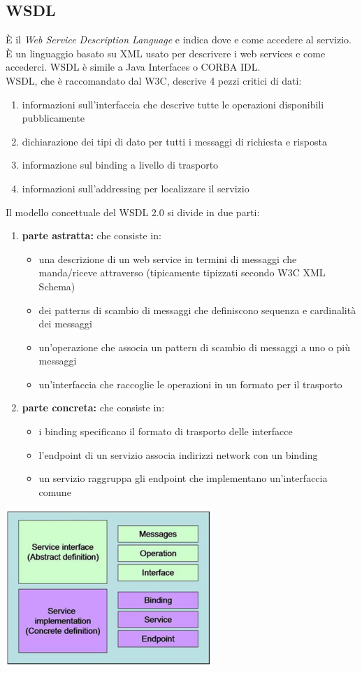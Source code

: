 \documentclass[a4paper,12pt, oneside]{book}
\begin{document}
\subsection{WSDL}
È il \textit{Web Service Description Language} e indica dove e come accedere al servizio.
È un linguaggio basato su XML usato per descrivere i web services e come accederci.
WSDL è simile a Java Interfaces o CORBA IDL.\\
WSDL, che è raccomandato dal W3C, descrive 4 pezzi critici di dati:
\begin{enumerate}
\item informazioni sull'interfaccia che descrive tutte le operazioni disponibili pubblicamente
\item dichiarazione dei tipi di dato per tutti i messaggi di richiesta e risposta
\item informazione sul binding a livello di trasporto
\item informazioni sull'addressing per localizzare il servizio
\end{enumerate}
Il modello concettuale del WSDL 2.0 si divide in due parti:
\begin{enumerate}
\item \textbf{parte astratta:} che consiste in:
 \begin{itemize}
 \item una descrizione di un web service in termini di messaggi che manda/riceve attraverso (tipicamente tipizzati secondo W3C XML Schema)
 \item dei patterns di scambio di messaggi che definiscono sequenza e cardinalità dei messaggi
 \item un'operazione che associa un pattern di scambio di messaggi a uno o più messaggi
 \item un'interfaccia che raccoglie le operazioni in un formato per il trasporto
 \end{itemize}
\item \textbf{parte concreta:} che consiste in:
  \begin{itemize}
    \item i binding specificano il formato di trasporto delle interfacce
    \item l'endpoint di un servizio associa indirizzi network con un binding   
   \item un servizio raggruppa gli endpoint che implementano un'interfaccia comune
  \end{itemize}
\end{enumerate}
\begin{center}
\includegraphics[scale=0.7]{img/wsdl.png}
\end{center}
\end{document}
